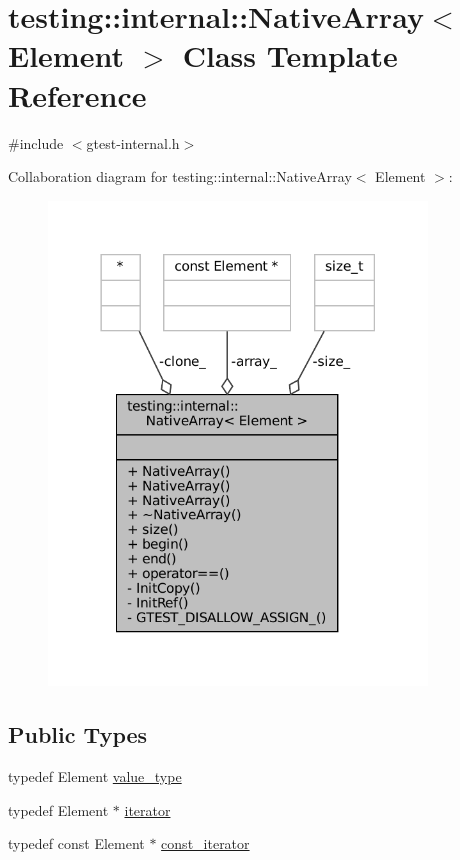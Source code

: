 \hypertarget{classtesting_1_1internal_1_1NativeArray}{}\section{testing\+:\+:internal\+:\+:Native\+Array$<$ Element $>$ Class Template Reference}
\label{classtesting_1_1internal_1_1NativeArray}


{\ttfamily \#include $<$gtest-\/internal.\+h$>$}



Collaboration diagram for testing\+:\+:internal\+:\+:Native\+Array$<$ Element $>$\+:
\nopagebreak
\begin{figure}[H]
\begin{center}
\leavevmode
\includegraphics[width=285pt]{classtesting_1_1internal_1_1NativeArray__coll__graph}
\end{center}
\end{figure}
\subsection*{Public Types}
\begin{DoxyCompactItemize}
\item 
typedef Element \hyperlink{classtesting_1_1internal_1_1NativeArray_a12216d686e16e4cc63d952fada5b2ba9}{value\+\_\+type}
\item 
typedef Element $\ast$ \hyperlink{classtesting_1_1internal_1_1NativeArray_ac1301a57977b57a1ad013e4e25fc2a72}{iterator}
\item 
typedef const Element $\ast$ \hyperlink{classtesting_1_1internal_1_1NativeArray_a9ce7c8408460d7158a2870456d134557}{const\+\_\+iterator}
\end{DoxyCompactItemize}
